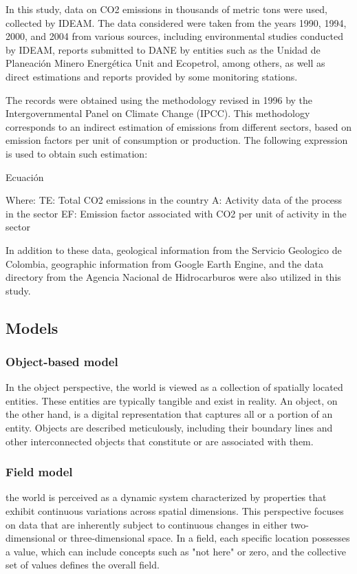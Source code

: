 \documentclass{ifacconf}
\begin{document}
In this study, data on CO2 emissions in thousands of metric tons were used, collected by IDEAM. The data considered were taken from the years 1990, 1994, 2000, and 2004 from various sources, including environmental studies conducted by IDEAM, reports submitted to DANE by entities such as the Unidad de Planeación Minero Energética Unit and Ecopetrol, among others, as well as direct estimations and reports provided by some monitoring stations.

The records were obtained using the methodology revised in 1996 by the Intergovernmental Panel on Climate Change (IPCC). This methodology corresponds to an indirect estimation of emissions from different sectors, based on emission factors per unit of consumption or production. The following expression is used to obtain such estimation:

Ecuación

Where:
TE: Total CO2 emissions in the country
A: Activity data of the process in the sector
EF: Emission factor associated with CO2 per unit of activity in the sector

In addition to these data, geological information from the Servicio Geologico de Colombia, geographic information from Google Earth Engine, and the data directory from the Agencia Nacional de Hidrocarburos were also utilized in this study.

\subsection{Models}

\subsubsection{Object-based model}
 In the object perspective, the world is viewed as a collection of spatially located entities. These entities are typically tangible and exist in reality. An object, on the other hand, is a digital representation that captures all or a portion of an entity. Objects are described meticulously, including their boundary lines and other interconnected objects that constitute or are associated with them.
\subsubsection{Field model}
the world is perceived as a dynamic system characterized by properties that exhibit continuous variations across spatial dimensions. This perspective focuses on data that are inherently subject to continuous changes in either two-dimensional or three-dimensional space. In a field, each specific location possesses a value, which can include concepts such as "not here" or zero, and the collective set of values defines the overall field.
\end{document}
